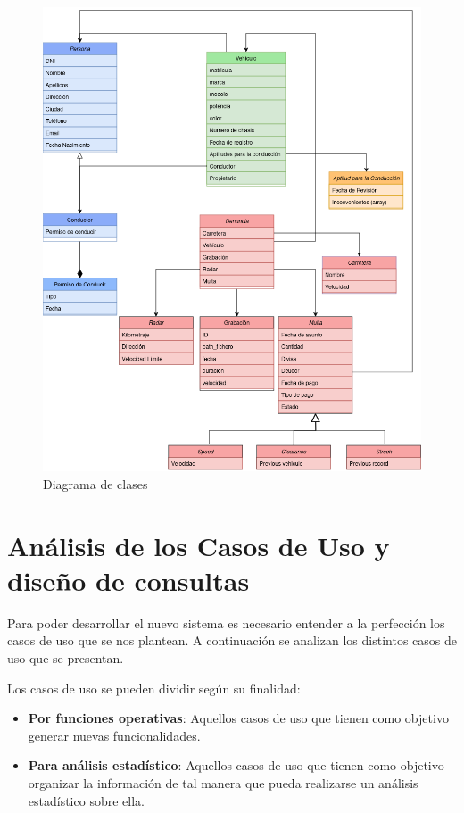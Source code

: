 \documentclass[]{article}
\begin{document}
\begin{figure}[H]
    \centering
    \includegraphics[width=\textwidth]{./imagenes/diagramaUML.png}
    \caption{Diagrama de clases}
    \label{fig:clases}
\end{figure}

\newpage


\section{Análisis de los Casos de Uso y diseño de consultas}
\label{sec:analisis_casos_de_uso}

Para poder desarrollar el nuevo sistema es necesario entender a la perfección
los casos de uso que se nos plantean. A continuación se analizan los
distintos casos de uso que se presentan.

Los casos de uso se pueden dividir según su finalidad:
\begin{itemize}
    \item \textbf{Por funciones operativas}: Aquellos casos de uso que tienen como objetivo generar nuevas funcionalidades.
    \item \textbf{Para análisis estadístico}: Aquellos casos de uso que tienen como objetivo organizar la información de tal manera que pueda realizarse un análisis estadístico sobre ella.
\end{itemize}
\end{document}
